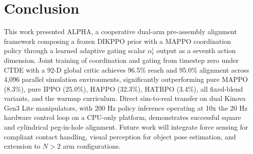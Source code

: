 \documentclass[lettersize,journal]{IEEEtran}
\begin{document}
\section{Conclusion}
\label{conclusion}
This work presented ALPHA, a cooperative dual-arm pre-assembly alignment framework composing a frozen DIKPPO prior with a MAPPO coordination policy through a learned adaptive gating scalar $\alpha^{i}_{t}$ output as a seventh action dimension. Joint training of coordination and gating from timestep zero under CTDE with a 92-D global critic achieves 96.5\% reach and 95.0\% alignment across 4,096 parallel simulation environments, significantly outperforming pure MAPPO (8.3\%), pure IPPO (25.0\%), HAPPO (32.3\%), HATRPO (3.4\%), all fixed-blend variants, and the warmup curriculum. Direct sim-to-real transfer on dual Kinova Gen3 Lite manipulators, with 200 Hz policy inference operating at 10x the 20 Hz hardware control loop on a CPU-only platform, demonstrates successful square and cylindrical peg-in-hole alignment. Future work will integrate force sensing for compliant contact handling, visual perception for object pose estimation, and extension to $N>2$ arm configurations.




\end{document}

